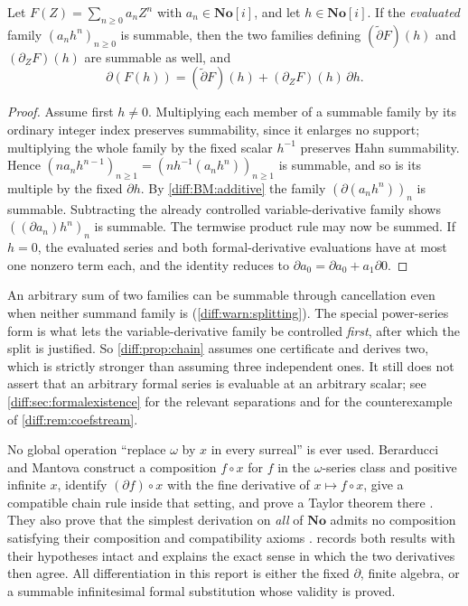 \documentclass[11pt,letterpaper]{article}
\numberwithin{equation}{section}
\theoremstyle{definition}
\theoremstyle{remark}
\newcommand{\No}{\mathbf{No}}
\newcommand{\SC}{\mathbf{No}[i]}
\newcommand{\der}{\partial}
\newcommand{\dertil}{\widetilde{\der}}
\newcommand{\derZ}{\der_{Z}}
\begin{document}
\begin{proposition}
\label{diff:prop:chain}
Let $F(Z)=\sum_{n\geq0}a_{n}Z^{n}$ with $a_{n}\in\SC$, and let $h\in\SC$.
If the \emph{evaluated} family $(a_{n}h^{n})_{n\geq0}$ is summable, then the
two families defining $(\dertil F)(h)$ and $(\derZ F)(h)$ are summable as
well, and
\[
 \der(F(h))=(\dertil F)(h)+(\derZ F)(h)\,\der h .
\]
\end{proposition}
\begin{proof}
Assume first $h\neq0$. Multiplying each member of a summable family by its
ordinary integer index preserves summability, since it enlarges no support;
multiplying the whole family by the fixed scalar $h^{-1}$ preserves Hahn
summability. Hence
$(na_{n}h^{n-1})_{n\geq1}=(nh^{-1}(a_{n}h^{n}))_{n\geq1}$ is summable, and so
is its multiple by the fixed $\der h$. By \ref{diff:BM:additive} the family
$(\der(a_{n}h^{n}))_{n}$ is summable. Subtracting the already controlled
variable-derivative family shows $((\der a_{n})h^{n})_{n}$ is summable. The
termwise product rule may now be summed. If $h=0$, the evaluated series and
both formal-derivative evaluations have at most one nonzero term each, and the
identity reduces to $\der a_{0}=\der a_{0}+a_{1}\der 0$.
\end{proof}

\begin{remark}
\label{diff:rem:chainstrength}
An arbitrary sum of two families can be summable through cancellation even
when neither summand family is (\cref{diff:warn:splitting}). The special
power-series form is what lets the variable-derivative family be controlled
\emph{first}, after which the split is justified. So
\cref{diff:prop:chain} assumes one certificate and derives two, which is
strictly stronger than assuming three independent ones. It still does not
assert that an arbitrary formal series is evaluable at an arbitrary scalar; see
\cref{diff:sec:formalexistence} for the relevant separations and for the
counterexample of \cref{diff:rem:coefstream}.
\end{remark}

\begin{remark}
\label{diff:rem:nocomposition}
No global operation ``replace $\omega$ by $x$ in every surreal'' is ever used.
Berarducci and Mantova construct a composition $f\circ x$ for $f$ in the
$\omega$-series class and positive infinite $x$, identify $(\der f)\circ x$
with the fine derivative of $x\mapsto f\circ x$, give a compatible chain rule
inside that setting, and prove a Taylor theorem there
\cite[Cor.\ 7.6--7.7, Thms 7.14, 8.2]{BMGerms}. They also prove that the
simplest derivation on \emph{all} of $\No$ admits no composition satisfying
their composition and compatibility axioms
\cite[Thm 8.4]{BMGerms}.  records both results with
their hypotheses intact and explains the exact sense in which the two
derivatives then agree. All differentiation in this report is either the fixed
$\der$, finite algebra, or a summable infinitesimal formal substitution whose
validity is proved.
\end{remark}
\end{document}
